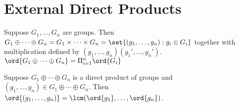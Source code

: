 \section{External Direct Products}

\begin{definition}
    Suppose $G_1, \dots, G_n$ are groups. Then $G_1 \oplus \cdots \oplus G_n = G_1 \times \cdots \times G_n = \set{(g_1, \dots, g_n): g_i \in G_i}$ together with multiplication defined by $(g_1,\dots,g_n)(g_1',\dots,g_n')$. $\ord{G_1 \oplus \cdots \oplus G_n} = \Pi_{i=1}^n \ord{G_i}$
\end{definition}

\begin{theorem}
    Suppose $G_1 \oplus \cdots \oplus G_n$ is a direct product of groups and $(g_1, \dots, g_n) \in G_1 \oplus \cdots \oplus G_n$. Then $\ord{(g_1, \dots, g_n)} = \lcm(\ord{g_1}, \dots, \ord{g_n})$.
\end{theorem}